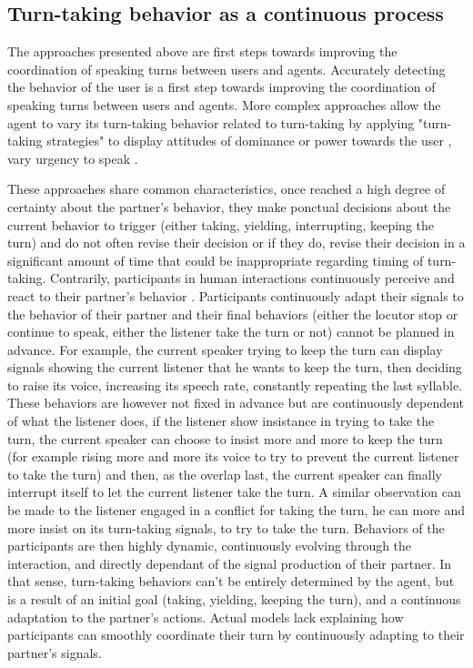 \subsection{Turn-taking behavior as a continuous process }

The approaches presented above are first steps towards improving the coordination of speaking turns between users and agents. Accurately detecting the behavior of the user is a first step towards improving the coordination of speaking turns between users and agents. More complex approaches allow the agent to vary its turn-taking behavior related to turn-taking by applying "turn-taking strategies" \citep{ter_maat_how_2010} to display attitudes of dominance or power towards the user \citep{ravenet_conversational_2015,cafaro_effects_2016}, vary urgency to speak \citep{selfridge_bidding_2009}.

 These approaches share common characteristics, once reached a high degree of certainty about the partner's behavior, they make ponctual decisions about the current behavior to trigger (either taking, yielding, interrupting, keeping the turn) and do not often revise their decision or if they do, revise their decision in a significant amount of time that could be inappropriate regarding timing of turn-taking.
 Contrarily, participants in human interactions continuously perceive and react to their partner's behavior \citep{clancy_co-constructed_2015}. Participants continuously adapt their signals to the behavior of their partner and their final behaviors (either the locutor stop or continue to speak, either the listener take the turn or not) cannot be planned in advance. For example, the current speaker trying to keep the turn can display signals showing the current listener that he wants to keep the turn, then deciding to raise its voice, increasing its speech rate, constantly repeating the last syllable. These behaviors are however not fixed in advance but are continuously dependent of what the listener does, if the listener show insistance in trying to take the turn, the current speaker can choose to insist more and more to keep the turn (for example rising more and more its voice to try to prevent the current listener to take the turn) and then, as the overlap last, the current speaker can finally interrupt itself to let the current listener take the turn.  
 A similar observation can be made to the listener engaged in a conflict for taking the turn, he can more and more insist on its turn-taking signals, to try to take the turn.
 Behaviors of the participants are then highly dynamic, continuously evolving through the interaction, and directly dependant of the signal production of their partner. In that sense, turn-taking behaviors can't be entirely determined by the agent, but is a result of an initial goal (taking, yielding, keeping the turn), and a continuous adaptation to the partner's actions. Actual models lack explaining how participants can smoothly coordinate their turn by continuously adapting to their partner's signals.  
 
